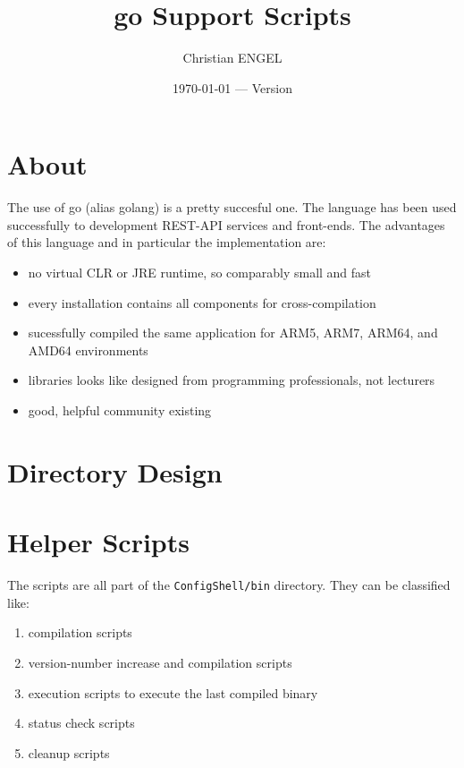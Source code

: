 \documentclass[a4paper]{article}
\date{\today{} --- Version \versionNr{}}
\begin{document}
\newcommand{\versionNr}{0.0.1}


\title{go Support Scripts}
\author{Christian ENGEL}
\maketitle


\tableofcontents

\section{About}

The use of go (alias golang) is a pretty succesful one.  The language has been used successfully to development
REST-API services and front-ends. The advantages of this language and in particular the implementation are:

\begin{itemize}
    \item no virtual CLR or JRE runtime, so comparably small and fast
    \item every installation contains all components for cross-compilation
    \item sucessfully compiled the same application for ARM5, ARM7, ARM64, and AMD64 environments
    \item libraries looks like designed from programming professionals, not lecturers
    \item good, helpful community existing
\end{itemize}

\section{Directory Design}

\section{Helper Scripts}

The scripts are all part of the \texttt{ConfigShell/bin} directory. They can be classified like:

\begin{enumerate}
    \item compilation scripts
    \item version-number increase and compilation scripts
    \item execution scripts to execute the last compiled binary
    \item status check scripts
    \item cleanup scripts
\end{enumerate}
\end{document}
